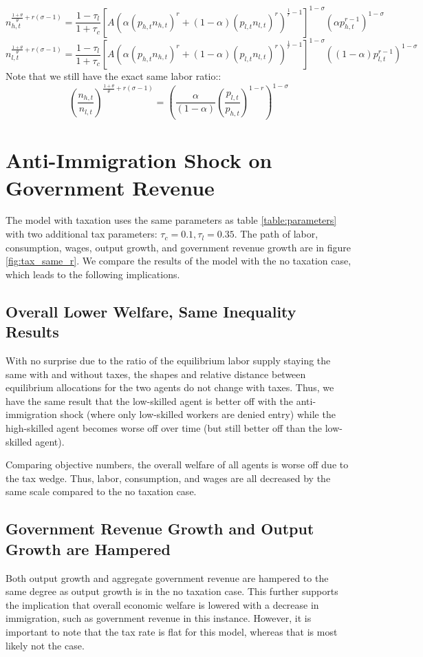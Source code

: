 \documentclass[11pt]{article}
\begin{document}
  $$ n_{h,t}^{\frac{1+\theta}{\theta}+r(\sigma-1)} = \frac{1-\tau_l}{1+\tau_c}[A(\alpha (p_{h,t} n_{h,t})^r + (1-\alpha) (p_{l,t} n_{l,t})^r )^{\frac{1}{r}-1}]^{1-\sigma} (\alpha p_{h,t}^{r-1})^{1-\sigma}$$
  $$ n_{l,t}^{\frac{1+\theta}{\theta}+r(\sigma-1)} = \frac{1-\tau_l}{1+\tau_c}[A(\alpha (p_{h,t} n_{h,t})^r + (1-\alpha) (p_{l,t} n_{l,t})^r )^{\frac{1}{r}-1}]^{1-\sigma} ((1-\alpha) p_{l,t}^{r-1})^{1-\sigma}$$
  Note that we still have the exact same labor ratio::
  $$\left(\frac{n_{h,t}}{n_{l,t}}\right)^{\frac{1+\theta}{\theta}+r(\sigma-1)}=\left(\frac{\alpha}{(1-\alpha)}\left(\frac{p_{l,t}}{p_{h,t}}\right)^{1-r}\right)^{1-\sigma}$$

\section{Anti-Immigration Shock on Government Revenue}
The model with taxation uses the same parameters as table \ref{table:parameters} with two additional tax parameters: $\tau_c = 0.1, \tau_l=0.35$. The path of labor, consumption, wages, output growth, and government revenue growth are in figure \ref{fig:tax_same_r}. We compare the results of the model with the no taxation case, which leads to the following implications.

\subsection{Overall Lower Welfare, Same Inequality Results}
With no surprise due to the ratio of the equilibrium labor supply staying the same with and without taxes, the shapes and relative distance between equilibrium allocations for the two agents do not change with taxes. Thus, we have the same result that the low-skilled agent is better off with the anti-immigration shock (where only low-skilled workers are denied entry) while the high-skilled agent becomes worse off over time (but still better off than the low-skilled agent).

Comparing objective numbers, the overall welfare of all agents is worse off due to the tax wedge. Thus, labor, consumption, and wages are all decreased by the same scale compared to the no taxation case.

\subsection{Government Revenue Growth and Output Growth are Hampered}
Both output growth and aggregate government revenue are hampered to the same degree as output growth is in the no taxation case. This further supports the implication that overall economic welfare is lowered with a decrease in immigration, such as government revenue in this instance. However, it is important to note that the tax rate is flat for this model, whereas that is most likely not the case.
\end{document}
